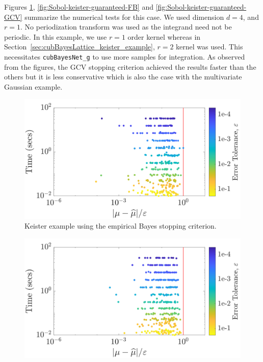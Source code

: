 \documentclass{svjour3}                     %
\newcommand{\code}[1]{\texttt{#1}}
\newcommand\secref{Section~\ref}
\begin{document}
{{{{{{Figures \ref{fig:Sobol-keister-guaranteed-MLE}, \ref{fig:Sobol-keister-guaranteed-FB} and \ref{fig:Sobol-keister-guaranteed-GCV} summarize the numerical tests for this case. We used  dimension $d=4$, and $r=1$.  No periodization transform was used as the integrand need not be periodic. 
In this example, we use $r=1$ order kernel whereas in \secref{sec:cubBayesLattice_keister_example}, $r=2$ kernel was used. This necessitates \code{cubBayesNet\_g} to use more samples for integration.
As observed from the figures, the GCV stopping criterion achieved the results faster than the others but it is less conservative which is also the case with the multivariate Gaussian example.

\begin{figure}
\centering
\includegraphics[width=0.95\linewidth]{"figures/Sobol/Sobol_Keister_guaranteed_time_MLE__d4_r1_2019-Sep-1"}
\caption[Sobol: Keister guaranteed: MLE]{Keister example using the empirical Bayes stopping criterion.}
\label{fig:Sobol-keister-guaranteed-MLE}
\end{figure}
\begin{figure}
\centering
\includegraphics[width=0.95\linewidth]{"figures/Sobol/Sobol_Keister_guaranteed_time_full__d4_r1_2019-Sep-1"}

\end{figure}}}}}}}
\end{document}
